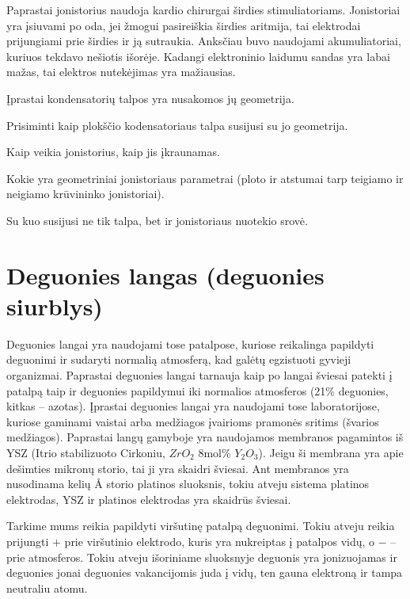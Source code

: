 Paprastai jonistorius naudoja kardio chirurgai širdies stimuliatoriams.
Jonistoriai yra įsiuvami po oda, jei žmogui pasireiškia širdies aritmija,
tai elektrodai prijungiami prie širdies ir ją sutraukia. Anksčiau
buvo naudojami akumuliatoriai, kuriuos tekdavo nešiotis išorėje.
Kadangi elektroninio laidumu sandas yra labai mažas, tai elektros
nutekėjimas yra mažiausias.

\begin{remember}
  \item Įprastai kondensatorių talpos yra nusakomos jų geometrija.
  \item Prisiminti kaip plokščio kodensatoriaus talpa susijusi su
    jo geometrija.
  \item Kaip veikia jonistorius, kaip jis įkraunamas.
  \item Kokie yra geometriniai jonistoriaus parametrai (ploto ir atstumai
    tarp teigiamo ir neigiamo krūvininko jonistoriai).
  \item Su kuo susijusi ne tik talpa, bet ir jonistoriaus nuotekio
    srovė.
\end{remember}

\section{Deguonies langas (deguonies siurblys)}

Deguonies langai yra naudojami tose patalpose, kuriose reikalinga
papildyti deguonimi ir sudaryti normalią atmosferą, kad galėtų
egzistuoti gyvieji organizmai. Paprastai deguonies langai tarnauja
kaip po langai šviesai patekti į patalpą taip ir deguonies papildymui
iki normalios atmosferos (21\% deguonies, kitkas – azotas). Įprastai
deguonies langai yra naudojami tose laboratorijose, kuriose gaminami
vaistai arba medžiagos įvairioms pramonės sritims (švarios medžiagos).
Paprastai langų gamyboje yra naudojamos membranos pagamintos iš
YSZ (Itrio stabilizuoto Cirkoniu, $ZrO_{2}$ 8mol\% $Y_2O_{3}$). Jeigu
ši membrana yra apie dešimties mikronų storio, tai ji yra skaidri
šviesai. Ant membranos yra nusodinama kelių Å storio platinos sluoksnis,
tokiu atveju sistema platinos elektrodas, YSZ ir platinos elektrodas
yra skaidrūs šviesai.

 Tarkime mums reikia papildyti viršutinę patalpą deguonimi.
Tokiu atveju reikia prijungti $+$ prie viršutinio elektrodo, kuris
yra nukreiptas į patalpos vidų, o $-$ – prie atmosferos. Tokiu atveju
išoriniame sluoksnyje deguonis yra jonizuojamas ir deguonies jonai
deguonies vakancijomis juda į vidų, ten gauna elektroną ir tampa
neutraliu atomu.

